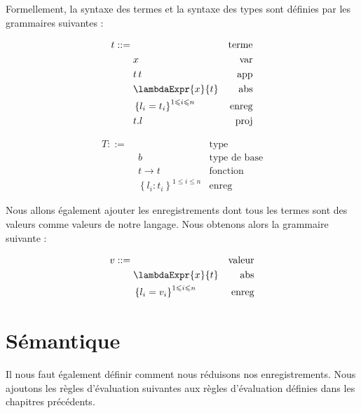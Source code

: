 Formellement, la syntaxe des termes et la syntaxe des types sont définies par
les grammaires suivantes :

\begin{minipage}{0.45\textwidth}
  \begin{align*}
    t ::= & \, & \text{terme} \\
          & \; x & \text{var} \\
          & \; t \, t & \text{app} \\
          & \; \lambdaExpr{x}{t} & \text{abs} \\
          & \; \left\{ l_{i} = t_{i} \right\}^{1 \leq i \leq n} & \text{enreg} \\
          & \; t.l & \text{proj}
  \end{align*}
\end{minipage}
\label{syntax-terms:lambda-calculus-with-records}
\begin{minipage}{0.45\textwidth}
  \begin{align*}
    T ::= & \, & \text{type} \\
          & \; b & \text{type de base} \\
          & \; t \rightarrow t & \text{fonction} \\
          & \; \left\{ l_{i} : t_{i} \right\}^{1 \leq i \leq n} & \text{enreg}
  \end{align*}
\end{minipage}
\label{syntax-types:lambda-calculus-with-records}

Nous allons également ajouter les enregistrements dont tous les termes sont des
valeurs comme valeurs de notre langage. Nous obtenons alors la grammaire
suivante :

\label{syntax-values:lambda-calculus-with-records}
\begin{align*}
  v ::= & \, & \text{valeur} \\
        & \; \lambdaExpr{x}{t} & \text{abs} \\
          & \; \left\{ l_{i} = v_{i} \right\}^{1 \leq i \leq n} & \text{enreg} \\
\end{align*}

\section*{Sémantique}

Il nous faut également définir comment nous réduisons nos
enregistrements. Nous ajoutons les règles d'évaluation suivantes aux règles
d'évaluation définies dans les chapitres précédents.

